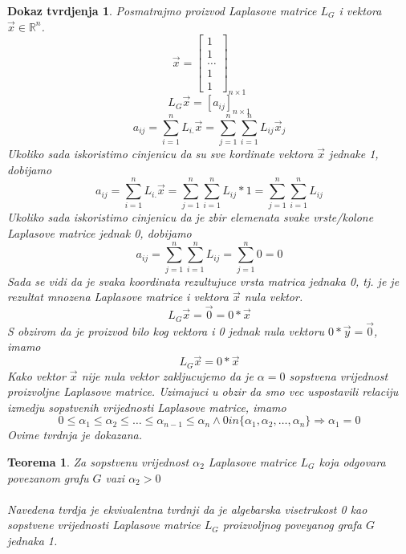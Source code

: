 \documentclass[11pt]{article}
\newtheorem{theorem}{Teorema}
\newtheorem*{custom_proof}{Dokaz tvrdjenja}
\begin{document}
	\begin{custom_proof}
	Posmatrajmo proizvod Laplasove matrice $L_G$ i vektora $\vec{x} \in \mathbb{R}^n$.
	\[
	\vec{x} = 
	\begin{bmatrix} 
	1 \\ 1 \\ \dots \\ 1 \\ 1
	\end{bmatrix}
	_{n \times 1}
	\]
	\[
	L_G\vec{x} = [a_{ij}]_{n \times 1}
	\]
	\[
		a_{ij} = \sum_{i=1}^{n}L_{i.}\vec{x} = \sum_{j=1}^{n}\sum_{i=1}^{n}L_{ij} \vec{x}_j 
	\]
	Ukoliko sada iskoristimo cinjenicu da su sve kordinate vektora $\vec{x}$ jednake 1, dobijamo
	\[
		a_{ij} = \sum_{i=1}^{n}L_{i.}\vec{x} = \sum_{j=1}^{n}\sum_{i=1}^{n}L_{ij} * 1 = \sum_{j=1}^{n}\sum_{i=1}^{n}L_{ij}
	\]
	Ukoliko sada iskoristimo cinjenicu da je zbir elemenata svake vrste/kolone Laplasove matrice jednak 0, dobijamo
	\[
		a_{ij} = \sum_{j=1}^{n}\sum_{i=1}^{n}L_{ij} = \sum_{j=1}^{n} 0 = 0
	\]
	Sada se vidi da je svaka koordinata rezultujuce vrsta matrica jednaka 0, tj. je je rezultat mnozena Laplasove matrice i vektora $\vec{x}$ nula vektor.
	\[
	L_G\vec{x} = \vec{0} = 0 * \vec{x}
	\]
	S obzirom da je proizvod bilo kog vektora i 0 jednak nula vektoru $0 * \vec{y} = \vec{0}$, imamo
	\[
	L_G\vec{x} = 0 * \vec{x}
	\]
	Kako vektor $\vec{x}$ nije nula vektor zakljucujemo da je $\alpha = 0$ sopstvena vrijednost proizvoljne Laplasove matrice. Uzimajuci u obzir da smo vec uspostavili relaciju izmedju sopstvenih vrijednosti Laplasove matrice, imamo
	\[
		0 \leq \alpha_1 \leq \alpha_2 \leq \dots \leq \alpha_{n-1} \leq \alpha_n \land 0 in \{\alpha_1, \alpha_2, \dots, \alpha_n\} \Rightarrow \alpha_1 = 0
	\]
	Ovime tvrdnja je dokazana.
	\end{custom_proof}
	
	\begin{theorem} Za sopstvenu vrijednost $\alpha_2$ Laplasove matrice $L_G$ koja odgovara povezanom grafu $G$ vazi $\alpha_2>0$
	\paragraph{}
	Navedena tvrdja je ekvivalentna tvrdnji da je algebarska visetrukost 0 kao sopstvene vrijednosti Laplasove matrice $L_G$ proizvoljnog poveyanog grafa $G$ jednaka 1.
	\end{theorem}
	
\end{document}
